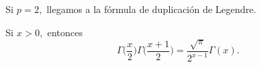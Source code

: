 Si $p = 2,$ llegamos a la fórmula de duplicación de Legendre.
\begin{corollary}
	Si $x > 0,$ entonces
	$$\Gamma\bigg(\frac{x}{2}\bigg)\Gamma\bigg(\frac{x+1}{2}\bigg) = \frac{\sqrt{\pi}}{2^{x-1}}\Gamma(x).$$
\end{corollary}
\endinput